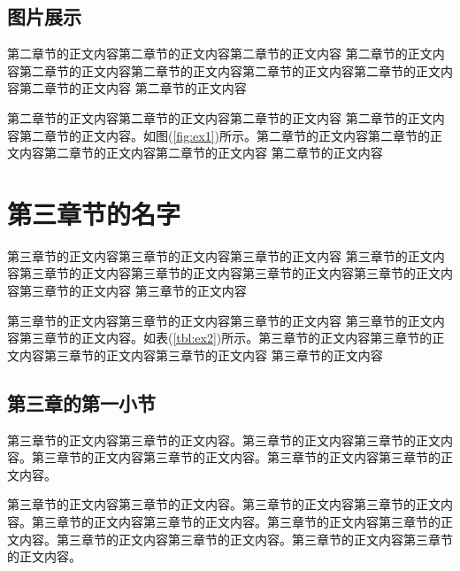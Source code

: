 \documentclass{yacauthesisug}
\begin{document}
\subsection{图片展示}

第二章节的正文内容第二章节的正文内容\cite{王夫之1845}第二章节的正文内容
第二章节的正文内容第二章节的正文内容第二章节的正文内容第二章节的正文内容第二章节的正文内容第二章节的正文内容
第二章节的正文内容


第二章节的正文内容第二章节的正文内容第二章节的正文内容
第二章节的正文内容第二章节的正文内容。如图(\ref{fig:ex1})所示。第二章节的正文内容第二章节的正文内容第二章节的正文内容第二章节的正文内容
第二章节的正文内容

\section{第三章节的名字}

第三章节的正文内容第三章节的正文内容第三章节的正文内容
第三章节的正文内容第三章节的正文内容第三章节的正文内容第三章节的正文内容第三章节的正文内容第三章节的正文内容
第三章节的正文内容


第三章节的正文内容第三章节\cite{KENNEDY1975-339-360}的正文内容第三章节的正文内容
第三章节的正文内容第三章节的正文内容。如表(\ref{tbl:ex2})所示。第三章节的正文内容第三章节的正文内容第三章节的正文内容第三章节的正文内容
第三章节的正文内容

\subsection{第三章的第一小节}

第三章节的正文内容第三章节的正文内容。第三章节的正文内容第三章节的正文内容。第三章节的正文内容第三章节的正文内容。第三章节的正文内容第三章节的正文内容。

第三章节的正文内容第三章节的正文内容。第三章节的正文内容第三章节的正文内容。第三章节的正文内容第三章节的正文内容。第三章节的正文内容第三章节的正文内容。第三章节的正文内容第三章节的正文内容。第三章节的正文内容第三章节的正文内容。
\end{document}
